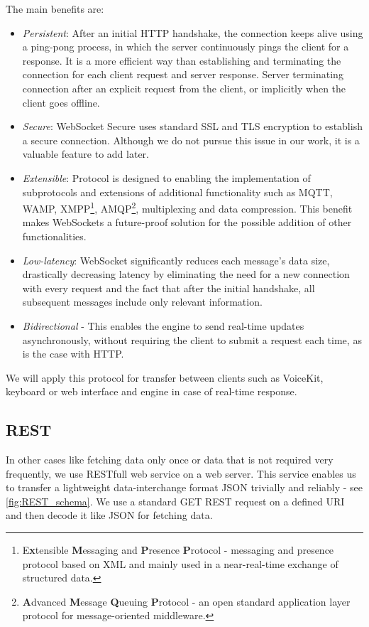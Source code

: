 The main benefits are:

\begin{itemize}
	\item \textit{Persistent}: After an initial HTTP handshake, the connection keeps alive using a ping-pong process, in which the server continuously pings the client for a response. It is a more efficient way than establishing and terminating the connection for each client request and server response. Server terminating connection after an explicit request from the client, or implicitly when the client goes offline.
	\item \textit{Secure}: WebSocket Secure uses standard SSL and TLS encryption to establish a secure connection. Although we do not pursue this issue in our work, it is a valuable feature to add later.
	\item \textit{Extensible}: Protocol is designed to enabling the implementation of subprotocols and extensions of additional functionality such as MQTT, WAMP, XMPP\footnote{E\textbf{x}tensible \textbf{M}essaging and \textbf{P}resence \textbf{P}rotocol - messaging and presence protocol based on XML and mainly used in a near-real-time exchange of structured data.}, AMQP\footnote{\textbf{A}dvanced \textbf{M}essage \textbf{Q}ueuing \textbf{P}rotocol - an open standard application layer protocol for message-oriented middleware.}, multiplexing and data compression. This benefit makes WebSockets a future-proof solution for the possible addition of other functionalities.
	\item \textit{Low-latency}: WebSocket significantly reduces each message's data size, drastically decreasing latency by eliminating the need for a new connection with every request and the fact that after the initial handshake, all subsequent messages include only relevant information.
	\item \textit{Bidirectional} - This enables the engine to send real-time updates asynchronously, without requiring the client to submit a request each time, as is the case with HTTP. 
\end{itemize}

We will apply this protocol for transfer between clients such as VoiceKit, keyboard or web interface and engine in case of real-time response.

\subsection{REST}

In other cases like fetching data only once or data that is not required very frequently, we use RESTfull web service on a web server. This service enables us to transfer a lightweight data-interchange format JSON trivially and reliably - see \cref{fig:REST_schema}. We use a standard GET REST request on a defined URI and then decode it like JSON for fetching data.

